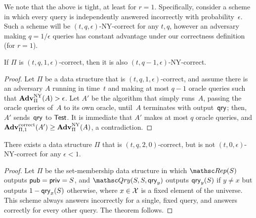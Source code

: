 We note that the above is tight, at least for $r=1$. Specifically, consider a scheme
in which every query is independently
answered incorrectly with probability~$\epsilon$. Such a
scheme will be $(t,q,\epsilon)$-NY-correct
for any $t, q$, however an adversary making $q=1/\epsilon$ queries has constant advantage
under our correctness definition (for $r=1$).

\begin{theorem}
If $\Pi$ is $(t, q, 1, \epsilon)$-correct, then it is also $(t, q-1, \epsilon)$-NY-correct.
\end{theorem}

\begin{proof}
Let $\Pi$ be a data structure that is $(t,q,1,\epsilon)$-correct,
and assume
there is an adversary $A$ running in time~$t$
and making at most $q-1$ oracle queries such that
$\mathrm{\mathbf{Adv}}^{\mathrm{NY}}_{\Pi}(A) > \epsilon$.
Let $A'$ be the algorithm that simply
runs~$A$, passing the oracle queries of~$A$ to its own oracle, until~$A$ terminates
with output~$\mathsf{qry}$; then, $A'$ sends~$\mathsf{qry}$ to $\mathsf{Test}$. It is immediate that $A'$ makes at most $q$ oracle queries, and
$\mathrm{\mathbf{Adv}}^{\mathrm{correct}}_{\Pi,1}(A') \geq \mathrm{\mathbf{Adv}}^{\mathrm{NY}}_{\Pi}(A)$, a contradiction.
\end{proof}

\begin{theorem}
There exists a data structure $\Pi$ that
is $(t, q, 2, 0)$-correct, but is not $(t, 0, \epsilon)$-NY-correct
for any $\epsilon<1$.
\end{theorem}
\begin{proof}
Let $\Pi$ be the set-membership data structure in which $\Rep(S)$ outputs
${\sf pub}={\sf priv}=S$, and
$\Qry(S, S, \qry_y)$ outputs $\mathsf{qry}_y(S)$ if $y \neq x$ but outputs $1-\mathsf{qry}_x(S)$ otherwise,
where $x \in {\cal X}$ is a fixed element of the universe. This
scheme always answers incorrectly for a single, fixed query, and answers
correctly for every other query. The theorem follows.
\end{proof}


